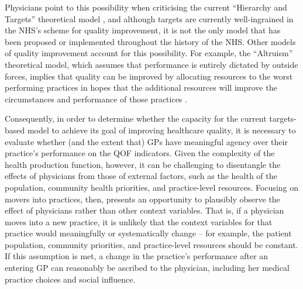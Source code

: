 \documentclass[12pt]{article}
\begin{document}
Physicians point to this possibility when criticising the current ``Hierarchy and Targets'' theoretical model  \citep{oliverCanFinancialIncentives2009}, and although targets are currently well-ingrained in the NHS's scheme for quality improvement, it is not the only model that has been proposed or implemented throughout the history of the NHS. Other models of quality improvement account for this possibility. For example, the ``Altruism'' theoretical model, which assumes that performance is entirely dictated by outside forces, implies that quality can be improved by allocating resources to the worst performing practices in hopes that the additional resources will improve the circumstances and performance of those practices \citep{bevanModelsGovernancePublic2013}.

Consequently, in order to determine whether the capacity for the current targets-based model to achieve its goal of improving healthcare quality, it is necessary to evaluate whether (and the extent that) GPs have meaningful agency over their practice's performance on the QOF indicators. Given the complexity of the health production function, however, it can be challenging to disentangle the effects of physicians from those of external factors, such as the health of the population, community health priorities, and practice-level resources. Focusing on movers into practices, then, presents an opportunity to plausibly observe the effect of physicians rather than other context variables. That is, if a physician moves into a new practice, it is unlikely that the context variables for that practice would meaningfully or systematically change -- for example, the patient population, community priorities, and practice-level resources should be constant. If this assumption is met, a change in the practice's performance after an entering GP can reasonably be ascribed to the physician, including her medical practice choices and social influence.
\end{document}
